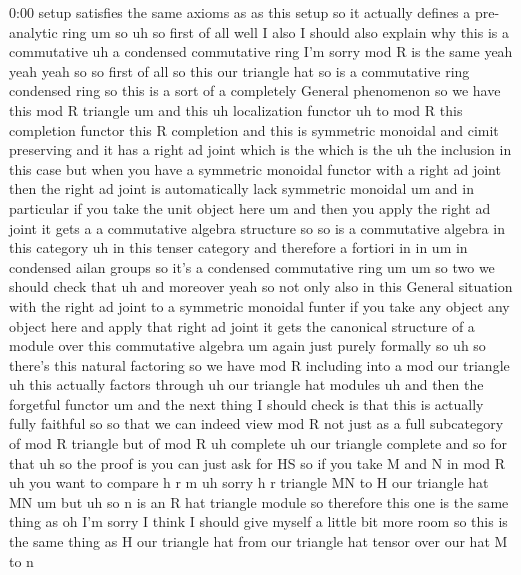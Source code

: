 \begin{unfinished}{0:00}
setup  satisfies  the  same  axioms  as  as
this  setup  so  it  actually  defines  a
pre-analytic
ring  um
so  uh  so  first  of  all  well  I  also  I
should  also  explain  why  this  is  a
commutative  uh  a  condensed  commutative
ring  I'm
sorry  mod  R  is  the  same  yeah  yeah  yeah
so  so  first  of  all  so  this  our  triangle
hat  so  is  a  commutative
ring  condensed
ring
so  this  is  a  sort  of  a  completely
General  phenomenon  so  we  have  this  mod  R
triangle  um  and  this  uh  localization
functor  uh  to  mod  R  this  completion
functor  this  R  completion  and  this  is
symmetric
monoidal  and  cimit  preserving  and  it  has
a  right  ad
joint  which  is  the  which  is  the  uh  the
inclusion  in  this  case  but  when  you  have
a  symmetric  monoidal  functor  with  a
right  ad  joint  then  the  right  ad  joint
is  automatically  lack  symmetric
monoidal  um  and  in  particular  if  you
take  the  unit  object  here  um  and  then
you  apply  the  right  ad  joint  it  gets  a  a
commutative  algebra  structure
so
so
is  a  commutative
algebra  in  this  category  uh  in  this
tenser  category  and  therefore  a  fortiori
in  in  um  in  condensed  ailan  groups  so
it's  a  condensed  commutative
ring
um
um  so  two  we  should  check  that  uh  and
moreover  yeah  so  not  only  also  in  this
General  situation  with  the  right  ad
joint  to  a  symmetric  monoidal  funter  if
you  take  any  object  any  object  here  and
apply  that  right  ad  joint  it  gets  the
canonical  structure  of  a  module  over
this  commutative
algebra  um  again  just  purely  formally  so
uh  so  there's  this  natural
factoring  so  we  have  mod  R  including
into  a  mod  our
triangle  uh  this  actually  factors
through  uh  our  triangle  hat
modules  uh  and  then  the  forgetful
functor  um  and  the  next  thing  I  should
check  is  that  this  is  actually  fully
faithful
so
so  that  we  can  indeed  view  mod  R  not
just  as  a  full  subcategory  of  mod  R
triangle  but  of  mod  R  uh
complete  uh  our  triangle  complete  and  so
for  that  uh  so  the  proof  is  you  can  just
ask  for  HS  so  if  you  take  M  and  N  in  mod
R  uh  you  want  to  compare  h  r  m  uh  sorry
h  r  triangle  MN  to  H
our  triangle  hat
MN
um  but  uh  so  n  is  an  R  hat  triangle
module  so  therefore  this  one  is  the  same
thing  as  oh  I'm  sorry  I  think  I  should
give  myself  a  little  bit  more  room  so
this  is  the  same  thing  as  H  our  triangle
hat  from  our  triangle  hat  tensor  over
our  hat  M  to  n

\end{unfinished}
